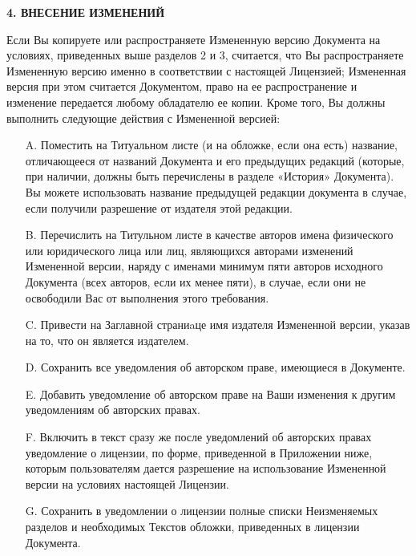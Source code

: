 \begin{center}
{\Large\bf 4. ВНЕСЕНИЕ ИЗМЕНЕНИЙ\par}
\end{center}

Если Вы копируете или распространяете Измененную версию Документа на
условиях, приведенных выше разделов 2 и 3, считается, что Вы
распространяете Измененную версию именно в соответствии с настоящей
Лицензией; Измененная версия при этом считается Документом, право на
ее распространение и изменение передается любому обладателю ее
копии. Кроме того, Вы должны выполнить следующие действия с Измененной
версией:

\begin{itemize}
\item[A.]
Поместить на Титуальном листе (и на обложке, если она есть) название,
отличающееся от названий Документа и его предыдущих редакций (которые,
при наличии, должны быть перечислены в разделе «История»
Документа). Вы можете использовать название предыдущей редакции
документа в случае, если получили разрешение от издателя этой
редакции.

\item[B.]
Перечислить на Титульном листе в качестве авторов имена физического
или юридического лица или лиц, являющихся авторами изменений
Измененной версии, наряду с именами минимум пяти авторов исходного
Документа (всех авторов, если их менее пяти), в случае, если они не
освободили Вас от выполнения этого требования.

\item[C.]
Привести на Заглавной страниaце имя издателя Измененной версии, указав
на то, что он является издателем.

\item[D.]
Сохранить все уведомления об авторском праве, имеющиеся в Документе.

\item[E.]
Добавить уведомление об авторском праве на Ваши изменения к другим
уведомлениям об авторских правах.

\item[F.]
Включить в текст сразу же после уведомлений об авторских правах
уведомление о лицензии, по форме, приведенной в Приложении ниже,
которым пользователям дается разрешение на использование Измененной
версии на условиях настоящей Лицензии.

\item[G.]
Сохранить в уведомлении о лицензии полные списки Неизменяемых разделов
и необходимых Текстов обложки, приведенных в лицензии Документа.


\end{itemize}
